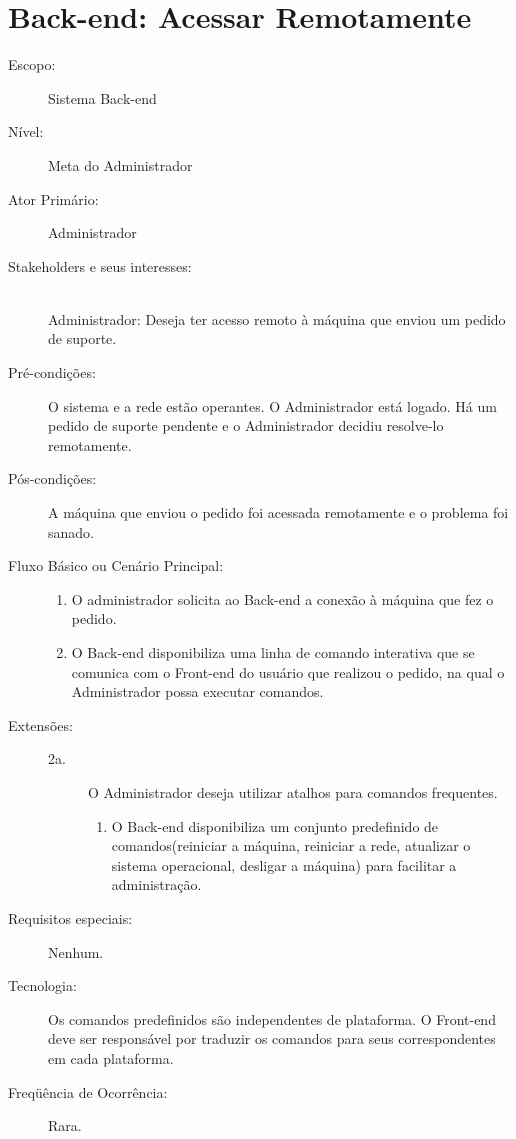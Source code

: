 \documentclass[brazil,times]{abnt}
\begin{document}
\section{Back-end: Acessar Remotamente} \label{Acessar-Remotamente}
\begin{description}
\item[Escopo:] Sistema Back-end
\item[Nível:] Meta do Administrador
\item[Ator Primário:] Administrador
\item[Stakeholders e seus interesses:] \hfill \\
Administrador: Deseja ter acesso remoto à máquina que enviou um pedido de
suporte.

\item[Pré-condições:] O sistema e a rede estão operantes. O Administrador está
logado. Há um pedido de suporte pendente e o Administrador decidiu resolve-lo
remotamente.
\item[Pós-condições:] A máquina que enviou o pedido foi acessada remotamente e o
problema foi sanado.
\item[Fluxo Básico ou Cenário Principal:]\hfill
\begin{enumerate}
  \item O administrador solicita ao Back-end a conexão à máquina que fez o
  pedido.
  \item O Back-end disponibiliza uma linha de comando interativa que se
  comunica com o Front-end do usuário que realizou o pedido, na qual o
  Administrador possa executar comandos.
  
\end{enumerate}

\item[Extensões:]\hfill
\begin{description}
	\item[2a.] O Administrador deseja utilizar atalhos para comandos frequentes.
	\begin{enumerate}
 		\item O Back-end disponibiliza um conjunto predefinido de
  comandos(reiniciar a máquina, reiniciar a rede, atualizar o sistema
  operacional, desligar a máquina) para facilitar a administração.
	\end{enumerate} 

\end{description}
\item[Requisitos especiais:] Nenhum.
\item[Tecnologia:] Os comandos predefinidos são independentes de plataforma. O
Front-end deve ser responsável por traduzir os comandos para seus
correspondentes em cada plataforma.
\item[Freqüência de Ocorrência:] Rara.

\end{description}
\end{document}
